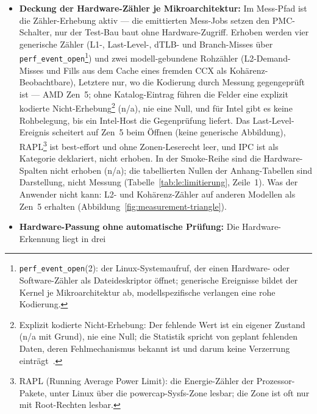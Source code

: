 \begin{nurlang}
\begin{itemize}
  Fingerprint der vermessenen Binary und die Hardware-Identität adressiert, die Plattform-Zelle daneben
  geklammert (Abschnitt~\ref{sec:lager}) ---; das gesamte Lager ist je Maschinentyp und
  Hardware-Konfiguration einzeln zu messen. Was der Anwender nicht kann: Messwerte einer Maschine auf
  eine andere übertragen. Das ist der Preis der maschinenspezifischen Optimierung
  (ATLAS~\cite{whaley2001atlas}, FFTW~\cite{frigo1998fftw}) und der Grund für die drei
  Maschinen-Signaturen der System-Registry.
  \item \textbf{Deckung der Hardware-Zähler je Mikroarchitektur:} Im Mess-Pfad ist die
  Zähler-Erhebung aktiv --- die emittierten Mess-Jobs setzen den PMC-Schalter, nur der Test-Bau baut
  ohne Hardware-Zugriff. Erhoben werden vier generische Zähler (L1-, Last-Level-, dTLB- und
  Branch-Misses über \texttt{perf\_event\_open}\footnote{\texttt{perf\_event\_open}(2): der
  Linux-Systemaufruf, der einen Hardware- oder Software-Zähler als Dateideskriptor öffnet; generische
  Ereignisse bildet der Kernel je Mikroarchitektur ab, modellspezifische verlangen eine rohe Kodierung.})
  und zwei modell-gebundene Rohzähler (L2-Demand-Misses und Fills aus dem Cache eines fremden CCX als
  Kohärenz-Beobachtbare), Letztere nur, wo die Kodierung durch Messung gegengeprüft ist --- AMD Zen~5; ohne
  Katalog-Eintrag führen die Felder eine explizit kodierte
  Nicht-Erhebung\footnote{Explizit kodierte Nicht-Erhebung: Der fehlende Wert ist ein eigener Zustand
  (n/a mit Grund), nie eine Null; die Statistik spricht von geplant fehlenden Daten, deren
  Fehlmechanismus bekannt ist und darum keine Verzerrung einträgt~\cite{graham2006planned,graham2009missing}.}
  (n/a), nie eine Null, und für Intel gibt es keine Rohbelegung, bis ein Intel-Host die Gegenprüfung
  liefert. Das Last-Level-Ereignis scheitert auf Zen~5 beim Öffnen (keine generische Abbildung),
  RAPL\footnote{RAPL (Running Average Power Limit): die Energie-Zähler der Prozessor-Pakete, unter
  Linux über die powercap-Sysfs-Zone lesbar; die Zone ist oft nur mit Root-Rechten lesbar.} ist
  best-effort und ohne Zonen-Leserecht leer, und IPC ist als Kategorie deklariert, nicht erhoben. In
  der Smoke-Reihe sind die Hardware-Spalten nicht erhoben (n/a); die tabellierten Nullen der
  Anhang-Tabellen sind Darstellung, nicht Messung (Tabelle~\ref{tab:le:limitierung}, Zeile~1). Was der
  Anwender nicht kann: L2- und Kohärenz-Zähler auf anderen Modellen als Zen~5 erhalten
  (Abbildung~\ref{fig:measurement-triangle}).
  \item \textbf{Hardware-Passung ohne automatische Prüfung:} Die Hardware-Erkennung liegt in drei

\end{itemize}
\end{nurlang}
